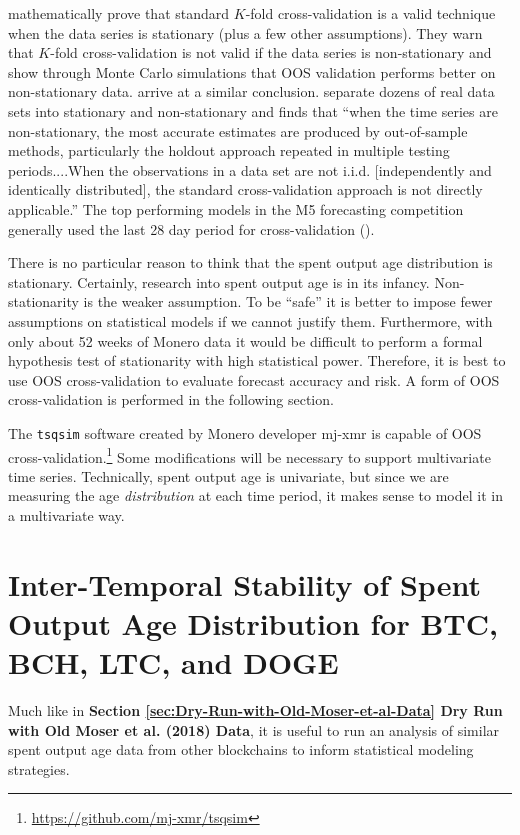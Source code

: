 \documentclass[english]{article}
\begin{document}
\cite{BERGMEIR201870} mathematically prove that standard $K$-fold
cross-validation is a valid technique when the data series is stationary
(plus a few other assumptions). They warn that $K$-fold cross-validation
is not valid if the data series is non-stationary and show through
Monte Carlo simulations that OOS validation performs better on non-stationary
data. \cite{BERGMEIR2012192} arrive at a similar conclusion. \cite{Cerqueira2020}
separate dozens of real data sets into stationary and non-stationary
and finds that ``when the time series are non-stationary, the most
accurate estimates are produced by out-of-sample methods, particularly
the holdout approach repeated in multiple testing periods....When
the observations in a data set are not i.i.d. {[}independently and
identically distributed{]}, the standard cross-validation approach
is not directly applicable.'' The top performing models in the M5
forecasting competition generally used the last 28 day period for
cross-validation (\cite{MAKRIDAKIS2022}).

There is no particular reason to think that the spent output age distribution
is stationary. Certainly, research into spent output age is in its
infancy. Non-stationarity is the weaker assumption. To be ``safe''
it is better to impose fewer assumptions on statistical models if
we cannot justify them. Furthermore, with only about 52 weeks of Monero
data it would be difficult to perform a formal hypothesis test of
stationarity with high statistical power. Therefore, it is best to
use OOS cross-validation to evaluate forecast accuracy and risk. A
form of OOS cross-validation is performed in the following section.

The \texttt{tsqsim} software created by Monero developer mj-xmr is
capable of OOS cross-validation.\footnote{\href{https://github.com/mj-xmr/tsqsim}{https://github.com/mj-xmr/tsqsim}}
Some modifications will be necessary to support multivariate time
series. Technically, spent output age is univariate, but since we
are measuring the age \textit{distribution} at each time period, it
makes sense to model it in a multivariate way.

\section{Inter-Temporal Stability of Spent Output Age Distribution for BTC,
BCH, LTC, and DOGE\label{sec:Inter-Temporal-Stability}}

Much like in \textbf{Section \ref{sec:Dry-Run-with-Old-Moser-et-al-Data}
Dry Run with Old M{\:o}ser et al. (2018) Data}, it is useful to run an
analysis of similar spent output age data from other blockchains to
inform statistical modeling strategies. 
\end{document}

